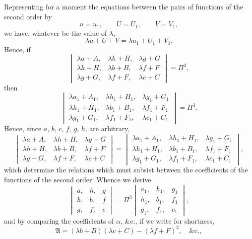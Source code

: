 \documentclass[11pt,a4paper]{article}
\theoremstyle{definition}
\begin{document}
Representing for a moment the equations between the pairs of functions of the second order by
\[
u = u_{1}, \qquad U = U_{1}, \qquad V = V_{1},
\]
we have, whatever be the value of $\lambda$,
\[
\lambda u + U + V = \lambda u_{1} + U_{1} + V_{1}.
\]
Hence, if
\[
\begin{vmatrix}
\lambda a + A, & \lambda h + H, & \lambda g + G \\
\lambda h + H, & \lambda b + B, & \lambda f + F \\
\lambda g + G, & \lambda f + F, & \lambda c + C
\end{vmatrix}
= \Pi^{3},
\]
then
\[
\begin{vmatrix}
\lambda a_{1} + A_{1}, & \lambda h_{1} + H_{1}, & \lambda g_{1} + G_{1} \\
\lambda h_{1} + H_{1}, & \lambda b_{1} + B_{1}, & \lambda f_{1} + F_{1} \\
\lambda g_{1} + G_{1}, & \lambda f_{1} + F_{1}, & \lambda c_{1} + C_{1}
\end{vmatrix}
= \Pi^{3}.
\]
Hence, since $a$, $b$, $c$, $f$, $g$, $h$, are arbitrary,
\[
\begin{vmatrix}
\lambda a + A, & \lambda h + H, & \lambda g + G \\
\lambda h + H, & \lambda b + B, & \lambda f + F \\
\lambda g + G, & \lambda f + F, & \lambda c + C
\end{vmatrix}
=
\begin{vmatrix}
\lambda a_{1} + A_{1}, & \lambda h_{1} + H_{1}, & \lambda g_{1} + G_{1} \\
\lambda h_{1} + H_{1}, & \lambda b_{1} + B_{1}, & \lambda f_{1} + F_{1} \\
\lambda g_{1} + G_{1}, & \lambda f_{1} + F_{1}, & \lambda c_{1} + C_{1}
\end{vmatrix},
\]
which determine the relations which must subsist between the coefficients of the functions of the second order. Whence we derive
\[
\begin{vmatrix}
a, & h, & g \\
h, & b, & f \\
g, & f, & c
\end{vmatrix}
= \Pi^{3}
\begin{vmatrix}
a_{1}, & h_{1}, & g_{1} \\
h_{1}, & b_{1}, & f_{1} \\
g_{1}, & f_{1}, & c_{1}
\end{vmatrix},
\]
and by comparing the coefficients of $\alpha$, \&c., if we write for shortness,
\[
\mathfrak{A} = (\lambda b + B)(\lambda c + C) - (\lambda f + F)^{2}, \quad \&\text{c.},
\]
\end{document}
